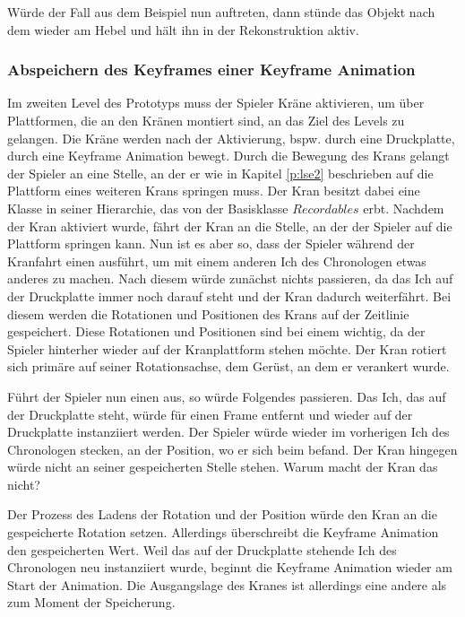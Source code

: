 Würde der Fall aus dem Beispiel nun auftreten, dann stünde das Objekt nach dem  wieder am Hebel und hält ihn in der Rekonstruktion aktiv.

\subsubsection{Abspeichern des Keyframes einer Keyframe Animation}
Im zweiten Level des Prototyps muss der Spieler Kräne aktivieren, um über Plattformen, die an den Kränen montiert sind, an das Ziel des Levels zu gelangen. Die Kräne werden nach der Aktivierung, bspw. durch eine Druckplatte, durch eine Keyframe Animation bewegt. Durch die Bewegung des Krans gelangt der Spieler an eine Stelle, an der er wie in Kapitel \ref{p:lse2} beschrieben auf die Plattform eines weiteren Krans springen muss. Der Kran besitzt dabei eine Klasse in seiner Hierarchie, das von der Basisklasse $Recordables$ erbt. Nachdem der Kran aktiviert wurde, fährt der Kran an die Stelle, an der der Spieler auf die Plattform springen kann. Nun ist es aber so, dass der Spieler während der Kranfahrt einen  ausführt, um mit einem anderen Ich des Chronologen etwas anderes zu machen. Nach diesem  würde zunächst nichts passieren, da das Ich auf der Druckplatte immer noch darauf steht und der Kran dadurch weiterfährt. Bei diesem  werden die Rotationen und Positionen des Krans auf der Zeitlinie gespeichert. Diese Rotationen und Positionen sind bei einem  wichtig, da der Spieler hinterher wieder auf der Kranplattform stehen möchte. Der Kran rotiert sich primäre auf seiner Rotationsachse, dem Gerüst, an dem er verankert wurde. 

Führt der Spieler nun einen  aus, so würde Folgendes passieren. Das Ich, das auf der Druckplatte steht, würde für einen Frame entfernt und wieder auf der Druckplatte instanziiert werden. Der Spieler würde wieder im vorherigen Ich des Chronologen stecken, an der Position, wo er sich beim  befand. Der Kran hingegen würde nicht an seiner gespeicherten Stelle stehen. Warum macht der Kran das nicht?

Der Prozess des Ladens der Rotation und der Position würde den Kran an die gespeicherte Rotation setzen. Allerdings überschreibt die Keyframe Animation den gespeicherten Wert. Weil das auf der Druckplatte stehende Ich des Chronologen neu instanziiert wurde, beginnt die Keyframe Animation wieder am Start der Animation. Die Ausgangslage des Kranes ist allerdings eine andere als zum Moment der Speicherung.  

